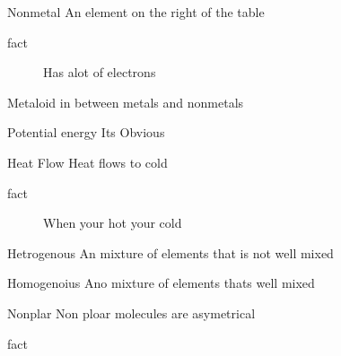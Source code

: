 \documentclass[avery5388,grid,frame]{flashcards}
\begin{document}
\begin{flashcard}[Definition]{Nonmetal}
  An element on the right of the table
  \begin{description}
    \item[fact] Has alot of electrons
  \end{description}
\end{flashcard}

\begin{flashcard}[Definition]{Metaloid}
  in between metals and nonmetals
\end{flashcard}

\begin{flashcard}[Definition]{Potential energy}
  Its Obvious
\end{flashcard}

\begin{flashcard}[Definition]{Heat Flow}
  Heat flows to cold
  \begin{description}
    \item[fact] When your hot your cold
  \end{description}
\end{flashcard}

\begin{flashcard}[Definition]{Hetrogenous}
  An mixture of elements that is not well mixed
\end{flashcard}

\begin{flashcard}[Definition]{Homogenoius}
  Ano mixture of elements thats well mixed
\end{flashcard}

\begin{flashcard}[Definition]{Nonplar}
  Non ploar molecules are asymetrical
  \begin{description}
    \item[fact] 
  \end{description}
\end{flashcard}
\end{document}
